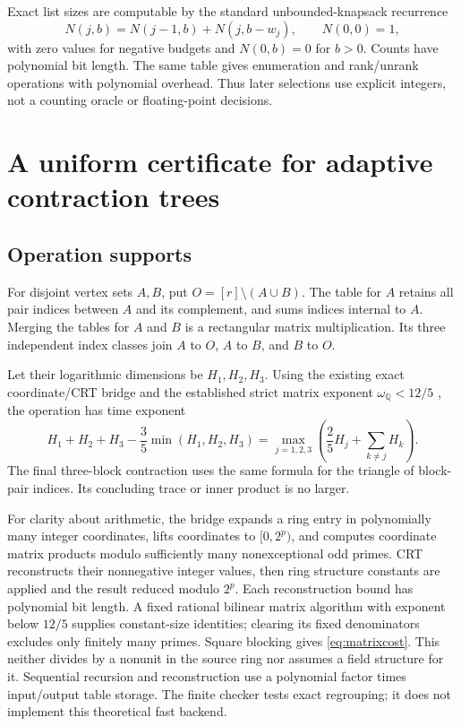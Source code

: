 \documentclass[11pt]{article}
\theoremstyle{remark}\newtheorem{remark}[theorem]{Remark}
\begin{document}
Exact list sizes are computable by the standard unbounded-knapsack recurrence
\[
 N(j,b)=N(j-1,b)+N(j,b-w_j),\qquad N(0,0)=1,
\]
with zero values for negative budgets and $N(0,b)=0$ for $b>0$. Counts have
polynomial bit length. The same table gives enumeration and rank/unrank
operations with polynomial overhead. Thus later selections use explicit
integers, not a counting oracle or floating-point decisions.

\section{A uniform certificate for adaptive contraction trees}
\label{sec:portfolio}

\subsection{Operation supports}
For disjoint vertex sets $A,B$, put $O=[r]\setminus(A\cup B)$. The table
for $A$ retains all pair indices between $A$ and its complement, and sums
indices internal to $A$. Merging the tables for $A$ and $B$ is a rectangular
matrix multiplication. Its three independent index classes join
$A$ to $O$, $A$ to $B$, and $B$ to $O$.

Let their logarithmic dimensions be $H_1,H_2,H_3$. Using the existing exact
coordinate/CRT bridge and the established strict matrix exponent
$\omega_{\mathbb Q}<12/5$ \cite{mm,tree}, the operation has time exponent
\begin{equation}
 H_1+H_2+H_3-\frac35\min(H_1,H_2,H_3)
 =\max_{j=1,2,3}\left(\frac25 H_j+\sum_{k\ne j}H_k\right).
 \label{eq:matrixcost}
\end{equation}
The final three-block contraction uses the same formula for the triangle of
block-pair indices. Its concluding trace or inner product is no larger.

For clarity about arithmetic, the bridge expands a ring entry in polynomially
many integer coordinates, lifts coordinates to $[0,2^p)$, and computes
coordinate matrix products modulo sufficiently many nonexceptional odd
primes. CRT reconstructs their nonnegative integer values, then ring
structure constants are applied and the result reduced modulo $2^p$.
Each reconstruction bound has polynomial bit length. A fixed rational
bilinear matrix algorithm with exponent below $12/5$ supplies constant-size
identities; clearing its fixed denominators excludes only finitely many
primes. Square blocking gives \eqref{eq:matrixcost}. This neither divides
by a nonunit in the source ring nor assumes a field structure for it.
Sequential recursion and reconstruction use a polynomial factor times
input/output table storage. The finite checker tests exact regrouping; it
does not implement this theoretical fast backend.
\end{document}
